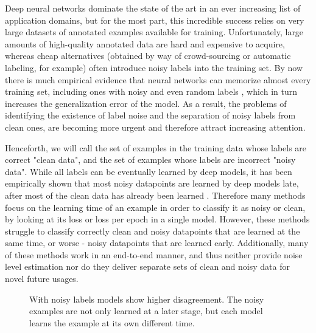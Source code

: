 \documentclass{article}
\begin{document}
Deep neural networks dominate the state of the art in an ever increasing list of application domains, but for the most part, this incredible success relies on very large datasets of annotated examples available for training. Unfortunately, large amounts of high-quality annotated data are hard and expensive to acquire, whereas cheap alternatives (obtained by way of crowd-sourcing or automatic labeling, for example) often introduce noisy labels into the training set. By now there is much empirical evidence that neural networks can memorize almost every training set, including ones with noisy and even random labels \cite{zhang2017ICLR}, which in turn increases the generalization error of the model. As a result, the problems of identifying the existence of label noise and the separation of noisy labels from clean ones, are becoming more urgent and therefore attract increasing attention. 

Henceforth, we will call the set of examples in the training data whose labels are correct "clean data", and the set of examples whose labels are incorrect "noisy data". While all labels can be eventually learned by deep models, it has been empirically shown that most noisy datapoints are learned by deep models late, after most of the clean data has already been learned \citep{arpit2017closer}. Therefore many methods focus on the learning time of an example in order to classify it as noisy or clean, by looking at its loss \citep{pleiss2020identifying,arazo2019unsupervised} or loss per epoch \citep{li2020dividemix} in a single model. However, these methods struggle to classify correctly clean and noisy datapoints that are learned at the same time, or worse - noisy datapoints that are learned early. Additionally, many of these methods work in an end-to-end manner, and thus neither provide noise level estimation nor do they deliver separate sets of clean and noisy data for novel future usages.

\begin{figure}
\centering
\vspace{-0.45cm}
\caption{With noisy labels models show higher disagreement. The noisy examples are not only learned at a later stage, but each model learns the example at its own different time.}
\vspace{-0.25cm}
\label{fig:1}
\end{figure}
\end{document}
